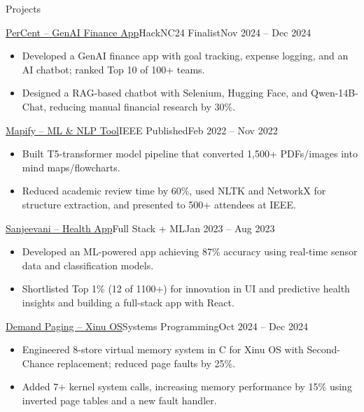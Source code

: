 \documentclass[]{mcdowellcv}
\begin{document}
\begin{cvsection}{Projects}
  \begin{cvsubsection}{\href{https://github.com/adityapai18/HackNC24}{PerCent – GenAI Finance App}}{HackNC24 Finalist}{Nov 2024 -- Dec 2024}
    \begin{itemize}
      \item Developed a GenAI finance app with goal tracking, expense logging, and an AI chatbot; ranked Top 10 of 100+ teams.
      \item Designed a RAG-based chatbot with Selenium, Hugging Face, and Qwen-14B-Chat, reducing manual financial research by 30\%.
    \end{itemize}
    \vspace{-1.5pt}
  \end{cvsubsection}

  \begin{cvsubsection}{\href{https://github.com/Aditya-k24/mapify}{Mapify – ML \& NLP Tool}}{IEEE Published}{Feb 2022 -- Nov 2022}
    \begin{itemize}
      \item Built T5-transformer model pipeline that converted 1,500+ PDFs/images into mind maps/flowcharts.
      \item Reduced academic review time by 60\%, used NLTK and NetworkX for structure extraction, and presented to 500+ attendees at IEEE.
    \end{itemize}
    \vspace{-1.5pt}
  \end{cvsubsection}

  \begin{cvsubsection}{\href{https://github.com/heet214/Sanjeevani-health}{Sanjeevani – Health App}}{Full Stack + ML}{Jan 2023 -- Aug 2023}
    \begin{itemize}
      \item Developed an ML-powered app achieving 87\% accuracy using real-time sensor data and classification models.
      \item Shortlisted Top 1\% (12 of 1100+) for innovation in UI and predictive health insights and building a full-stack app with React.
    \end{itemize}
    \vspace{-1.5pt}
  \end{cvsubsection}

  \begin{cvsubsection}{\href{https://github.com/ncsu-csc-501/project3-mndedhia_akulka26_aapai}{Demand Paging – Xinu OS}}{Systems Programming}{Oct 2024 -- Dec 2024}
    \begin{itemize}
      \item Engineered 8-store virtual memory system in C for Xinu OS with Second-Chance replacement; reduced page faults by 25\%.
      \item Added 7+ kernel system calls, increasing memory performance by 15\% using inverted page tables and a new fault handler.
    \end{itemize}
  \end{cvsubsection}
\end{cvsection}
\end{document}
